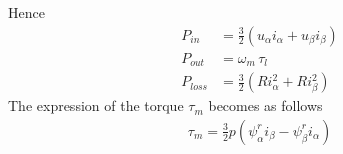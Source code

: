 \documentclass[12pt,a4paper,oneside]{book}
\begin{document}
\begin{onehalfspace}
Hence
\begin{equation*}
	\begin{aligned}
		P_{in} &= \frac{3}{2}\left( u_\alpha i_\alpha+u_\beta 
		i_\beta\right)  \\[6pt]
		P_{out} &= \omega_m\,\tau_l \\[6pt]
		P_{loss} &= \frac{3}{2}\left( Ri_\alpha^2+Ri_\beta^2\right) 
	\end{aligned} 
\end{equation*}
The expression of the torque $\tau_m$ becomes as follows
\begin{equation}
	\begin{aligned}
		\tau_m = \frac{3}{2}p\left( 
		\psi^r_{\alpha}i_{\beta}-\psi^r_{\beta}i_{\alpha}\right) 
	\end{aligned} 
\end{equation}


\end{onehalfspace}
\end{document}
